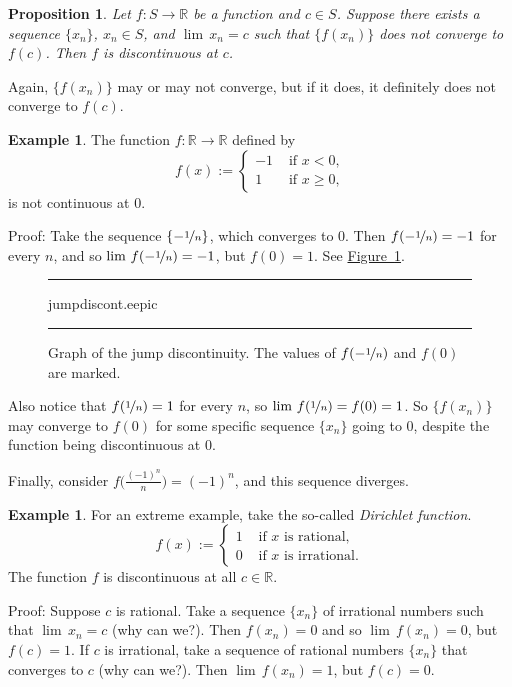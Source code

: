 \documentclass[12pt]{book}
\newenvironment{myfigureht}{%
\begin{figure}[h!t]
\noindent\rule{\textwidth}{0.4pt}\vspace{12pt}\par\centering}%
{\par\noindent\rule{\textwidth}{0.4pt}
\end{figure}}
\newcommand{\R}{{\mathbb{R}}}
\newcommand{\myindex}[1]{#1\index{#1}}
\theoremstyle{plain}
\newtheorem{prop}[thm]{Proposition}
\theoremstyle{remark}
\theoremstyle{definition}
\theoremstyle{exercise}
\theoremstyle{example}
\newtheorem{example}[thm]{Example}
\newcommand{\figureref}[1]{\hyperref[#1]{Figure~\ref*{#1}}}
\begin{document}
\begin{prop}
Let $f \colon S \to \R$ be a function and $c \in S$.  Suppose 
there exists a sequence $\{ x_n \}$, $x_n \in S$, and $\lim\, x_n = c$
such that $\{ f(x_n) \}$ does not converge to $f(c)$.  Then $f$ is 
discontinuous at $c$.
\end{prop}

Again, 
$\{ f(x_n) \}$ may or may not converge, but
if it does, it definitely does not converge to
$f(c)$.

\begin{example} \label{example:jumpdiscont}
The function $f \colon \R \to \R$ defined by
\begin{equation*}
f(x) := 
\begin{cases}
-1 & \text{ if $x < 0$,} \\
1 & \text{ if $x \geq 0$,}
\end{cases}
\end{equation*}
is not continuous at 0.

Proof: Take the sequence $\{ - \nicefrac{1}{n} \}$, which converges to 0.  Then
$f(-\nicefrac{1}{n}) = -1$ for every $n$,
and so
$\lim\, f(-\nicefrac{1}{n}) = -1$, but $f(0) = 1$.  See
\figureref{fig:jumpdiscont}.

\begin{myfigureht}
{jumpdiscont.eepic}
\caption{Graph of the jump discontinuity.  The values of
$f(-\nicefrac{1}{n})$ and $f(0)$ are marked.\label{fig:jumpdiscont}}
\end{myfigureht}

Also notice that $f(\nicefrac{1}{n}) = 1$ for every $n$,
so $\lim \, f(\nicefrac{1}{n}) = f(0) = 1$.  So
$\{ f(x_n) \}$ may converge to $f(0)$
for some specific
sequence $\{ x_n \}$ going to 0,
despite the function being discontinuous at 0.

Finally, consider $f\bigl(\frac{{(-1)}^n}{n}\bigr) = {(-1)}^n$,
and this sequence diverges.
\end{example}

\begin{example}
For an extreme example, take the so-called
\emph{\myindex{Dirichlet function}}.
\begin{equation*}
f(x) :=
\begin{cases}
1 & \text{ if $x$ is rational,} \\
0 & \text{ if $x$ is irrational.}
\end{cases}
\end{equation*}
The function $f$ is discontinuous at all $c \in \R$.

Proof:
Suppose $c$ is rational.  Take a sequence $\{ x_n \}$
of irrational numbers such that $\lim\, x_n = c$ (why can we?).  Then $f(x_n) = 0$
and so $\lim\, f(x_n) = 0$, but $f(c) = 1$.
If $c$ is irrational, take a sequence of rational numbers $\{ x_n \}$
that converges to $c$ (why can we?).  Then $\lim\, f(x_n) = 1$, but $f(c) = 0$.
\end{example}
\end{document}

